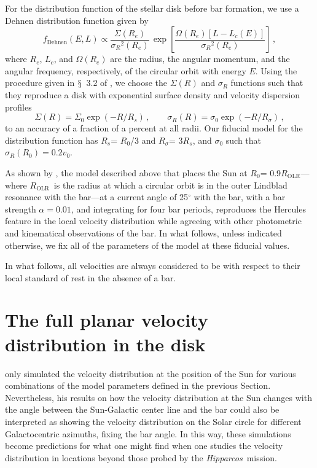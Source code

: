 \documentclass[12pt,preprint]{aastex}
\newcommand{\sectionname}{$\mathsection$}
\newcommand{\hipparcos}{\emph{Hipparcos}}
\newcommand{\vo}{\ensuremath{v_0}}
\newcommand{\Ro}{\ensuremath{R_0}}
\newcommand{\fdehnen}{\ensuremath{f_{\text{Dehnen}}}}
\newcommand{\sigmaR}{\ensuremath{\sigma_R}}
\newcommand{\rE}{\ensuremath{R_e}}
\newcommand{\Lc}{\ensuremath{L_c}}
\newcommand{\Rs}{\ensuremath{R_s}}
\newcommand{\Rsigma}{\ensuremath{R_{\sigma}}}
\newcommand{\Rolr}{\ensuremath{R_{\text{OLR}}}}
\begin{document}
For the distribution function of the stellar disk before bar
formation, we use a Dehnen distribution function \citep{dehnen99b}
given by
\begin{equation}\label{eq:fdehnen}
\fdehnen(E,L) \propto \frac{\Sigma(\rE)}{\sigmaR^2(\rE)} \, \exp\left[ \frac{\Omega(\rE)\left[L-\Lc(E)\right]}{\sigmaR^2(\rE)}\right]\,,
\end{equation}
where \rE, \Lc, and $\Omega(\rE)$ are the radius, the angular
momentum, and the angular frequency, respectively, of the circular
orbit with energy $E$. Using the procedure given in \sectionname~3.2
of \citet{dehnen99b}, we choose the $\Sigma(R)$ and $\sigmaR$
functions such that they reproduce a disk with exponential surface
density and velocity dispersion profiles 
\begin{equation}
\Sigma(R) = \Sigma_0 \exp\left(-R/\Rs\right)\,, \qquad 
\sigmaR(R) = \sigma_0 \exp\left(-R/\Rsigma\right)\,,
\end{equation}
to an accuracy of a fraction of a percent at all radii. Our fiducial
model for the distribution function has \Rs = \Ro /3 and \Rsigma =
3\Rs, and $\sigma_0$ such that $\sigmaR(\Ro) = 0.2 \vo$.

As shown by \citet{dehnen99c,dehnen00a}, the model described above
that places the Sun at \Ro = 0.9\Rolr---where \Rolr\ is the radius at
which a circular orbit is in the outer Lindblad resonance with the
bar---at a current angle of 25$^{\circ}$ with the bar, with a bar
strength $\alpha = 0.01$, and integrating for four bar periods,
reproduces the Hercules feature in the local velocity distribution
while agreeing with other photometric and kinematical observations of
the bar. In what follows, unless indicated otherwise, we fix all of
the parameters of the model at these fiducial values.


In what follows, all velocities are always considered to be with
respect to their local standard of rest in the absence of a bar.

\section{The full planar velocity distribution in the disk}\label{sec:2d}

\citet{dehnen00a} only simulated the velocity distribution at the
position of the Sun for various combinations of the model parameters
defined in the previous Section. Nevertheless, his results on how the
velocity distribution at the Sun changes with the angle between the
Sun-Galactic center line and the bar could also be interpreted as
showing the velocity distribution on the Solar circle for different
Galactocentric azimuths, fixing the bar angle. In this way, these
simulations become predictions for what one might find when one
studies the velocity distribution in locations beyond those probed by
the \hipparcos\ mission.
\end{document}

